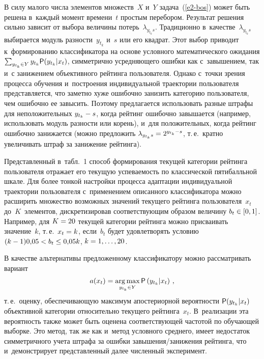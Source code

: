 \begin{multicols}{2}
      В силу малого числа элементов множеств~$X$ и~$Y$ задача~(\ref{e2-bos}) может 
быть решена в~каждый момент времени~$t$ простым перебором. Результат решения 
сильно зависит от выбора величины потерь~$\lambda_{y_{t_k}s}$. Традиционно 
в~качестве~$\lambda_{y_{t_k}s}$ выбирается модуль разности~$y_{t_k}$ и~$s$ или его 
квадрат. Этот выбор приводит к~формированию классификатора на основе условного 
математического ожидания $\sum\nolimits_{y_{t_k}\in Y} y_{t_k} 
{\sf P}(y_{t_k}\vert x_t)$, 
симметрично усред\-ня\-юще\-го ошибки как с~завышением, так и~с занижением объективного 
рейтинга пользователя. Однако с~точки зрения процесса обучения и~построения 
индивидуальной траектории пользователя представляется, что заметно хуже ошибочно 
занизить категорию пользователя, чем ошибочно ее завысить. Поэтому предлагается 
использовать разные штрафы для неположительных $y_{t_k}\hm-s$, когда рейтинг 
ошибочно завышается (например, использовать модуль разности или корень), и~для 
положительных, когда рейтинг ошибочно занижается (можно предложить
      $\lambda_{y_{t_k}s} \hm= 2^{y_{t_k}-s}$, т.\,е.\ кратно увеличивать штраф за 
занижение рейтинга).
      
      Представленный в~табл.~1 способ формирования текущей категории рейтинга 
пользователя отражает его текущую успеваемость по классической\linebreak
 пятибалльной шкале. 
Для более тонкой настройки процесса адаптации индивидуальной траектории 
пользователя с~применением описанного\linebreak
 классификатора можно расширить множество 
возможных значений текущего рейтинга пользователя~$x_t$ до~$K$~элементов, 
дискретизировав со\-от\-вет\-ст\-ву\-ющим образом величину $b_t\hm\in [0,1]$. Например, для 
$K\hm=20$ текущей категории рейтинга мож\-но присваивать значение~$k$, т.\,е.\ $x_t\hm= 
k$, если~$b_t$  будет удовлетворять условию $(k\hm-1)0{,}05\hm< b_t\hm\leq 0{,}05k$, 
$k\hm=1,\ldots , 20$.
      
      В качестве альтернативы предложенному классификатору можно рассматривать 
вариант
      \begin{equation}
      a(x_t)=\mathop{\mathrm{arg}\,\mathrm{max}}\limits_{y_{t_k}\in Y} {\sf P}\left( y_{t_k}\vert x_t\right)\,,
      \label{e3-bos}
      \end{equation}
т.\,е.\ оценку, обеспечивающую максимум апостериорной вероятности ${\sf P}(y_{t_k}\vert 
x_t)$ объективной категории относительно текущего рейтинга~$x_t$. В~реализации эта 
вероятность также может быть оценена соответствующей частотой по обучающей 
выборке. Это метод, так же как и~метод условного среднего, имеет недостаток 
симметричного учета штрафа за ошибки за\-вы\-ше\-ния/за\-ни\-же\-ния рейтинга, что 
и~демонстрирует представленный далее численный эксперимент.


\end{multicols}
